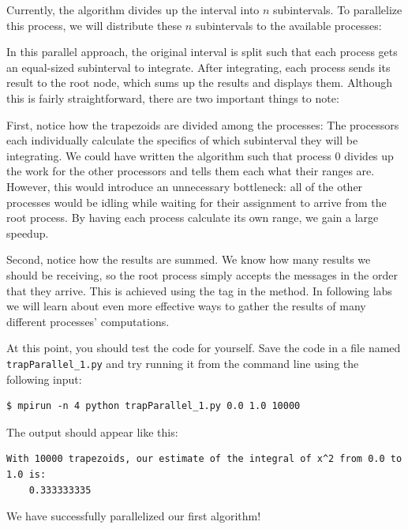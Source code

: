 Currently, the algorithm divides up the interval into $n$ subintervals. To parallelize this process, we will distribute these $n$ subintervals to the available processes:



In this parallel approach, the original interval is split such that each process gets an equal-sized subinterval to integrate. After integrating, each process sends its result to the root node, which sums up the results and displays them. Although this is fairly straightforward, there are two important things to note:

First, notice how the trapezoids are divided among the processes: The processors each individually calculate the specifics of which subinterval they will be integrating. We could have written the algorithm such that process 0 divides up the work for the other processors and tells them each what their ranges are. However, this would introduce an unnecessary bottleneck: all of the other processes would be idling while waiting for their assignment to arrive from the root process. By having each process calculate its own range, we gain a large speedup.

Second, notice how the results are summed. We know how many results we should be receiving, so the root process simply accepts the messages in the order that they arrive. This is achieved using the tag  in the  method. In following labs we will learn about even more effective ways to gather the results of many different processes' computations.


At this point, you should test the code for yourself. Save the code in a file named \texttt{trapParallel\_1.py} and try running it from the command line using the following input: 
\begin{lstlisting}[style=ShellInput]
$ mpirun -n 4 python trapParallel_1.py 0.0 1.0 10000
\end{lstlisting}
The output should appear like this:
\begin{lstlisting}[style=ShellOutput]
With 10000 trapezoids, our estimate of the integral of x^2 from 0.0 to 1.0 is:
    0.333333335
\end{lstlisting}
We have successfully parallelized our first algorithm!


